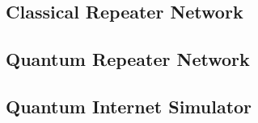 \subsection{Classical Repeater Network}
\subsection{Quantum Repeater Network}
\subsection{Quantum Internet Simulator}
\cite{satoh2021quisp}

